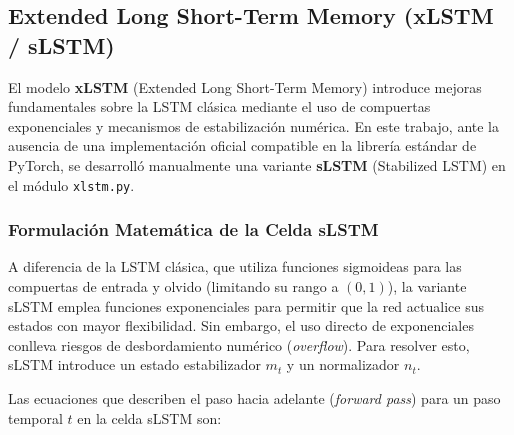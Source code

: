 \documentclass[12pt, a4paper]{article}
\newcommand{\code}[1]{\texttt{#1}}
\begin{document}
\subsection{Extended Long Short-Term Memory (xLSTM / sLSTM)}
\label{subsec:xlstm_theory}

El modelo \textbf{xLSTM} (Extended Long Short-Term Memory) \cite{beck2024xlstm} introduce mejoras fundamentales sobre la LSTM clásica mediante el uso de compuertas exponenciales y mecanismos de estabilización numérica. En este trabajo, ante la ausencia de una implementación oficial compatible en la librería estándar de PyTorch, se desarrolló manualmente una variante \textbf{sLSTM} (Stabilized LSTM) en el módulo \code{xlstm.py}.

\subsubsection{Formulación Matemática de la Celda sLSTM}

A diferencia de la LSTM clásica, que utiliza funciones sigmoideas para las compuertas de entrada y olvido (limitando su rango a $(0, 1)$), la variante sLSTM emplea funciones exponenciales para permitir que la red actualice sus estados con mayor flexibilidad. Sin embargo, el uso directo de exponenciales conlleva riesgos de desbordamiento numérico (\emph{overflow}). Para resolver esto, sLSTM introduce un estado estabilizador $m_t$ y un normalizador $n_t$.

Las ecuaciones que describen el paso hacia adelante (\emph{forward pass}) para un paso temporal $t$ en la celda sLSTM son:
\end{document}
